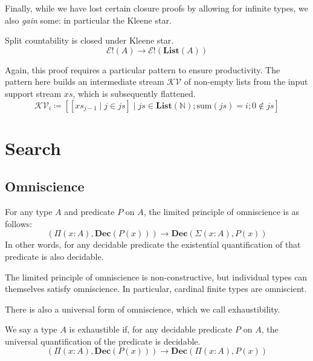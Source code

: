 Finally, while we have lost certain closure proofs by allowing for infinite
types, we also \emph{gain} some: in particular the Kleene star.
\begin{theorem}
  Split countability is closed under Kleene star.
  \begin{equation}
    \mathcal{E}!(A) \rightarrow \mathcal{E}!(\mathbf{List}(A))
  \end{equation}
\end{theorem}
Again, this proof requires a particular pattern to ensure productivity.
The pattern here builds an intermediate stream \(\mathcal{KV}\) of non-empty
lists from the input support stream \(\mathit{xs}\), which is subsequently
flattened.
\begin{equation}
  \mathcal{KV}_i \coloneqq \left[ \left[ \mathit{xs}_{j - 1} \mid j \in \mathit{js} \right] \mid \mathit{js} \in \mathbf{List}(\mathbb{N}) ; \text{sum}(\mathit{js}) = i ; 0 \notin \mathit{js}  \right]
\end{equation}
\section{Search} \label{search}
\subsection{Omniscience}
\begin{definition}
  For any type \(A\) and predicate \(P\) on \(A\), the limited principle of
  omniscience \cite{myhillErrettBishopFoundations1972} is as follows:
  \begin{equation}
    \left( \Pi {(x : A)} , \mathbf{Dec}(P(x)) \right) \rightarrow \mathbf{Dec} \left( \Sigma {(x : A)} , P(x) \right)
  \end{equation}
  In other words, for any decidable predicate the existential quantification of
  that predicate is also decidable.
\end{definition}
The limited principle of omniscience is non-constructive, but individual types
can themselves satisfy omniscience.
In particular, cardinal finite types are omniscient.

There is also a universal form of omniscience, which we call exhaustibility.
\begin{definition}[Exhaustibility]
  We say a type \(A\) is exhaustible if, for any decidable predicate \(P\) on
  \(A\), the universal quantification of the predicate is decidable.
  \begin{equation}
    \left( \Pi {(x : A)} , \mathbf{Dec}(P(x)) \right) \rightarrow \mathbf{Dec} \left( \Pi {(x : A)} , P(x) \right)
  \end{equation}
\end{definition}

